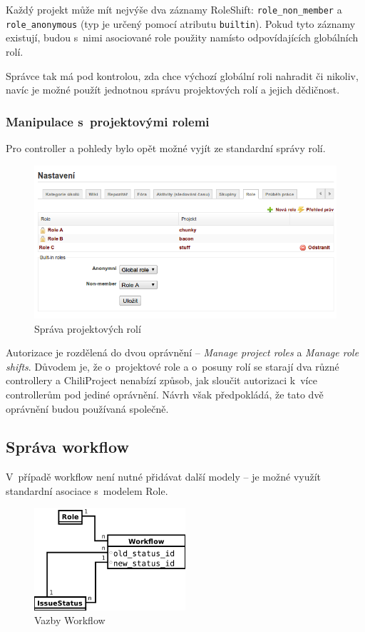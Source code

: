\documentclass[thesis=B,czech]{FITthesis}[2012/05/02]
\begin{document}
Každý projekt může mít nejvýše dva záznamy RoleShift:
\lstinline!role_non_member! a \lstinline!role_anonymous! (typ je určený
pomocí atributu \lstinline!builtin!). Pokud tyto záznamy existují, budou
s~nimi asociované role použity namísto odpovídajících globálních rolí.

Správce tak má pod kontrolou, zda chce výchozí globální roli nahradit či
nikoliv, navíc je možné použít jednotnou správu projektových rolí a
jejich dědičnost.

\subsubsection{Manipulace s~projektovými rolemi}

Pro controller a pohledy bylo opět možné vyjít ze standardní správy
rolí.

\begin{figure}[tbp]
\centering
\includegraphics[width=1\textwidth]{role-gui1.png}
\caption{Správa projektových rolí}
\end{figure}

Autorizace je rozdělená do dvou oprávnění -- \emph{Manage project roles} a
\emph{Manage role shifts}. Důvodem je, že o~projektové role a o~posuny rolí
se starají dva různé controllery a ChiliProject nenabízí způsob, jak
sloučit autorizaci k~více controllerům pod jediné oprávnění. Návrh však
předpokládá, že tato dvě oprávnění budou používaná společně.

\subsection{Správa workflow}

V~případě \gls{workflow} není nutné přidávat další modely -- je možné
využít standardní asociace s~modelem Role.

\begin{figure}[htbp]
\centering
\includegraphics[width=0.5\textwidth]{role-er3.pdf}
\caption{Vazby Workflow}
\label{fig:Workflow}
\end{figure}
\end{document}
